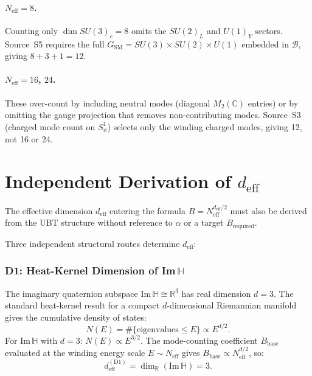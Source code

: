 \documentclass[12pt,a4paper]{article}
\theoremstyle{definition}
\theoremstyle{remark}
\begin{document}
\paragraph{$N_{\mathrm{eff}} = 8$.}
Counting only $\dim SU(3)_c = 8$ omits the $SU(2)_L$ and $U(1)_Y$ sectors.
Source~S5 requires the full $G_{\mathrm{SM}} = SU(3)\times SU(2)\times U(1)$
embedded in $\mathcal{B}$, giving $8+3+1 = 12$.

\paragraph{$N_{\mathrm{eff}} = 16$, $24$.}
These over-count by including neutral modes (diagonal $M_2(\mathbb{C})$ entries)
or by omitting the gauge projection that removes non-contributing modes.
Source~S3 (charged mode count on $S^1_\psi$) selects only the winding charged
modes, giving 12, not 16 or 24.

\section{Independent Derivation of $d_{\mathrm{eff}}$}
\label{sec:deff}

The effective dimension $d_{\mathrm{eff}}$ entering the formula
$B = N_{\mathrm{eff}}^{d_{\mathrm{eff}}/2}$ must also be derived from the UBT
structure without reference to $\alpha$ or a target $B_{\mathrm{required}}$.

Three independent structural routes determine $d_{\mathrm{eff}}$:

\subsubsection*{D1: Heat-Kernel Dimension of Im$\,\mathbb{H}$}

The imaginary quaternion subspace Im$\,\mathbb{H} \cong \mathbb{R}^3$ has real
dimension $d = 3$.  The standard heat-kernel result for a compact $d$-dimensional
Riemannian manifold gives the cumulative density of states:
\begin{equation}
  N(E) = \#\{\text{eigenvalues} \leq E\} \propto E^{d/2}.
\end{equation}
For Im$\,\mathbb{H}$ with $d = 3$: $N(E)\propto E^{3/2}$.  The mode-counting
coefficient $B_{\mathrm{base}}$ evaluated at the winding energy scale $E \sim N_{\mathrm{eff}}$
gives $B_{\mathrm{base}} \propto N_{\mathrm{eff}}^{d/2}$, so:
\begin{equation}
  d_{\mathrm{eff}}^{(\mathrm{D1})} = \dim_\mathbb{R}(\mathrm{Im}\,\mathbb{H}) = 3.
\end{equation}
\end{document}
